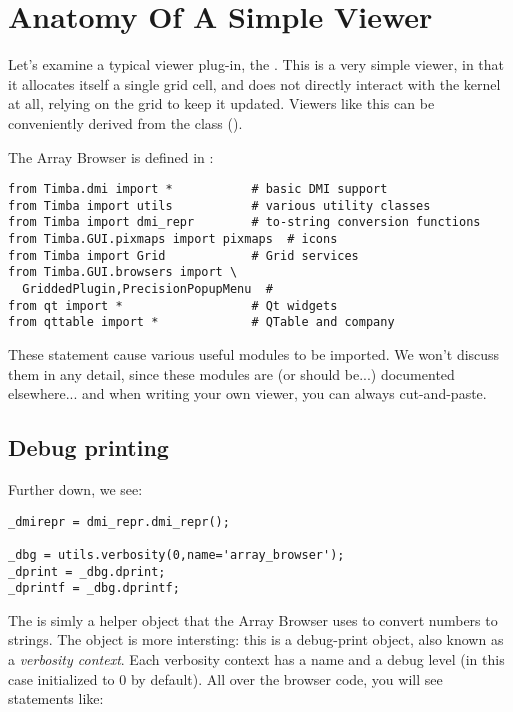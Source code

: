 \documentclass[12pt,twoside]{book}
\begin{document}
\section{Anatomy Of A Simple Viewer}

  Let's examine a typical viewer plug-in, the . This is a very simple viewer, in
  that it allocates itself a single grid cell, and does not directly interact
  with the kernel at all, relying on the grid to keep it updated. Viewers like
  this can be conveniently derived from the  class
  (). 
  
  The Array Browser is defined in :

\begin{verbatim}  
from Timba.dmi import *           # basic DMI support
from Timba import utils           # various utility classes
from Timba import dmi_repr        # to-string conversion functions
from Timba.GUI.pixmaps import pixmaps  # icons
from Timba import Grid            # Grid services
from Timba.GUI.browsers import \
  GriddedPlugin,PrecisionPopupMenu  # 
from qt import *                  # Qt widgets
from qttable import *             # QTable and company
\end{verbatim}

  These statement cause various useful modules to be imported. We won't discuss
  them in any detail, since these modules are (or should be...) documented
  elsewhere... and when writing your own viewer, you can always cut-and-paste.
  
\subsection{Debug printing} 

  Further down, we see:
  
\begin{verbatim}  
_dmirepr = dmi_repr.dmi_repr();

_dbg = utils.verbosity(0,name='array_browser');
_dprint = _dbg.dprint;
_dprintf = _dbg.dprintf;
\end{verbatim}
  
  The  is simly a helper object that the Array Browser uses to
  convert numbers to strings. The \qq{\_dbg} object is more intersting: this is
  a debug-print object, also known as a {\em verbosity context}. Each verbosity
  context has a name and a debug level (in this case initialized to 0 by
  default). All over the browser code, you will see statements like:
\end{document}
